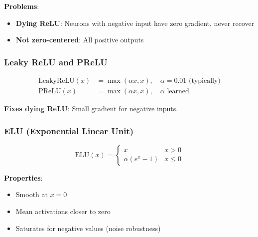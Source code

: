 \textbf{Problems}:
\begin{itemize}
    \item \textbf{Dying ReLU}: Neurons with negative input have zero gradient, never recover
    \item \textbf{Not zero-centered}: All positive outputs
\end{itemize}

\subsubsection{Leaky ReLU and PReLU}

\begin{align}
\text{LeakyReLU}(x) &= \max(\alpha x, x), \quad \alpha = 0.01 \text{ (typically)} \\
\text{PReLU}(x) &= \max(\alpha x, x), \quad \alpha \text{ learned}
\end{align}

\textbf{Fixes dying ReLU}: Small gradient for negative inputs.

\subsubsection{ELU (Exponential Linear Unit)}

\begin{equation}
\text{ELU}(x) = \begin{cases} x & x > 0 \\ \alpha(e^x - 1) & x \leq 0 \end{cases}
\end{equation}

\textbf{Properties}:
\begin{itemize}
    \item Smooth at $x = 0$
    \item Mean activations closer to zero
    \item Saturates for negative values (noise robustness)
\end{itemize}


